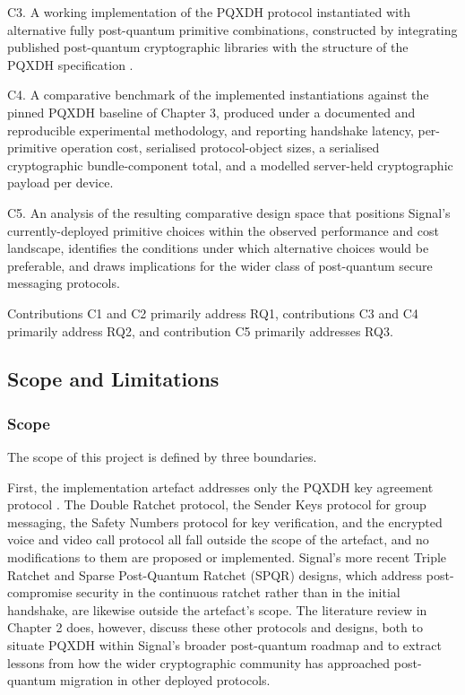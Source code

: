 C3. A working implementation of the PQXDH protocol instantiated with alternative fully post-quantum primitive combinations, constructed by integrating published post-quantum cryptographic libraries with the structure of the PQXDH specification \cite{kret_pqxdh_nodate}.

C4. A comparative benchmark of the implemented instantiations against the pinned PQXDH baseline of Chapter 3, produced under a documented and reproducible experimental methodology, and reporting handshake latency, per-primitive operation cost, serialised protocol-object sizes, a serialised cryptographic bundle-component total, and a modelled server-held cryptographic payload per device.

C5. An analysis of the resulting comparative design space that positions Signal's currently-deployed primitive choices within the observed performance and cost landscape, identifies the conditions under which alternative choices would be preferable, and draws implications for the wider class of post-quantum secure messaging protocols.

Contributions C1 and C2 primarily address RQ1, contributions C3 and C4 primarily address RQ2, and contribution C5 primarily addresses RQ3.

\subsection{Scope and Limitations}
\label{subsec:scope-limitations}

\subsubsection{Scope}
\label{subsubsec:scope}

The scope of this project is defined by three boundaries.

First, the implementation artefact addresses only the PQXDH key agreement protocol \cite{kret_pqxdh_nodate}. The Double Ratchet protocol, the Sender Keys protocol for group messaging, the Safety Numbers protocol for key verification, and the encrypted voice and video call protocol all fall outside the scope of the artefact, and no modifications to them are proposed or implemented. Signal's more recent Triple Ratchet and Sparse Post-Quantum Ratchet (SPQR) designs, which address post-compromise security in the continuous ratchet rather than in the initial handshake, are likewise outside the artefact's scope. The literature review in Chapter 2 does, however, discuss these other protocols and designs, both to situate PQXDH within Signal's broader post-quantum roadmap and to extract lessons from how the wider cryptographic community has approached post-quantum migration in other deployed protocols.

